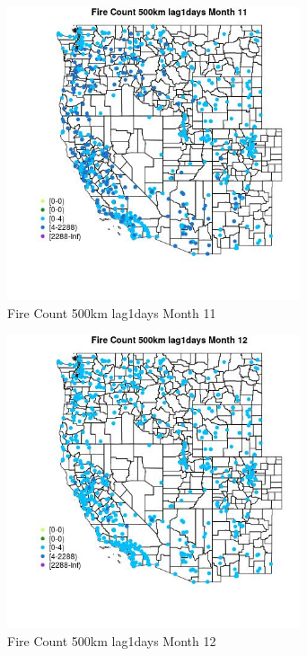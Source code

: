 \begin{figure} 
\centering  
\includegraphics[width=0.77\textwidth]{Code_Outputs/Report_ML_input_PM25_Step4_part_e_de_duplicated_aves_compiled_2019-05-21wNAs_MapObsMo11Fire_Count_500km_lag1days.jpg} 
\caption{\label{fig:Report_ML_input_PM25_Step4_part_e_de_duplicated_aves_compiled_2019-05-21wNAsMapObsMo11Fire_Count_500km_lag1days}Fire Count 500km lag1days Month 11} 
\end{figure} 
 

\begin{figure} 
\centering  
\includegraphics[width=0.77\textwidth]{Code_Outputs/Report_ML_input_PM25_Step4_part_e_de_duplicated_aves_compiled_2019-05-21wNAs_MapObsMo12Fire_Count_500km_lag1days.jpg} 
\caption{\label{fig:Report_ML_input_PM25_Step4_part_e_de_duplicated_aves_compiled_2019-05-21wNAsMapObsMo12Fire_Count_500km_lag1days}Fire Count 500km lag1days Month 12} 
\end{figure} 
 


